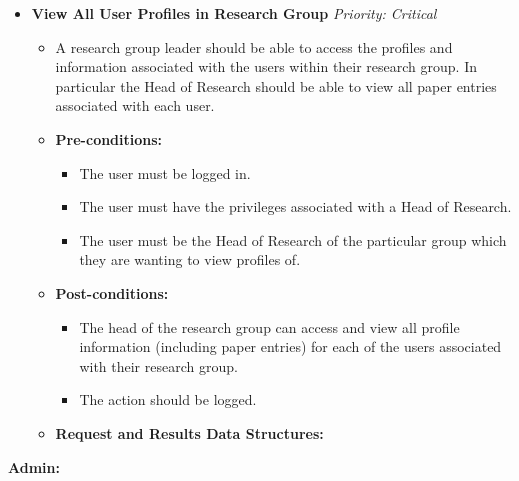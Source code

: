 \documentclass{article}
\begin{document}
\begin{itemize}
					\item \textbf{View All User Profiles in Research Group} \hfill \textit{Priority: Critical}
					\begin{itemize}
						\item A research group leader should be able to access the profiles and information associated with the users within their research group. In particular the Head of Research should be able to view all paper entries associated with each user.
						\item \textbf{Pre-conditions:}
						\begin{itemize}
							\item The user must be logged in.
							\item The user must have the privileges associated with a Head of Research.
							\item The user must be the Head of Research of the particular group which they are wanting to view profiles of.
						\end{itemize}
						\item \textbf{Post-conditions:}
						\begin{itemize}
							\item The head of the research group can access and view all profile information (including paper entries) for each of the users associated with their research group.
							\item The action should be logged.
						\end{itemize}
						\item \textbf{Request and Results Data Structures:}
					\end{itemize}					
				\end{itemize}
				\textbf{Admin:}
				
\end{document}
